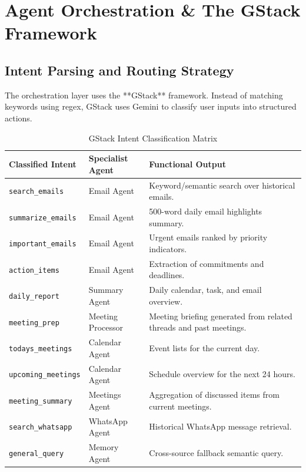 \documentclass[12pt,a4paper]{report}
\begin{document}
\chapter{Agent Orchestration \& The GStack Framework}
\label{chap:orchestrator}

\section{Intent Parsing and Routing Strategy}
The orchestration layer uses the **GStack** framework. Instead of matching keywords using regex, GStack uses Gemini to classify user inputs into structured actions.
\begin{table}[h]
\centering
\small
\begin{tabular}{L{3.5cm} L{3.5cm} L{8cm}}
\toprule
\textbf{Classified Intent} & \textbf{Specialist Agent} & \textbf{Functional Output} \\
\midrule
\texttt{search\_emails} & Email Agent & Keyword/semantic search over historical emails. \\
\texttt{summarize\_emails} & Email Agent & 500-word daily email highlights summary. \\
\texttt{important\_emails} & Email Agent & Urgent emails ranked by priority indicators. \\
\texttt{action\_items} & Email Agent & Extraction of commitments and deadlines. \\
\texttt{daily\_report} & Summary Agent & Daily calendar, task, and email overview. \\
\texttt{meeting\_prep} & Meeting Processor & Meeting briefing generated from related threads and past meetings. \\
\texttt{todays\_meetings} & Calendar Agent & Event lists for the current day. \\
\texttt{upcoming\_meetings} & Calendar Agent & Schedule overview for the next 24 hours. \\
\texttt{meeting\_summary} & Meetings Agent & Aggregation of discussed items from current meetings. \\
\texttt{search\_whatsapp} & WhatsApp Agent & Historical WhatsApp message retrieval. \\
\texttt{general\_query} & Memory Agent & Cross-source fallback semantic query. \\
\bottomrule
\end{tabular}
\caption{GStack Intent Classification Matrix}
\label{tab:intents}
\end{table}
\end{document}

